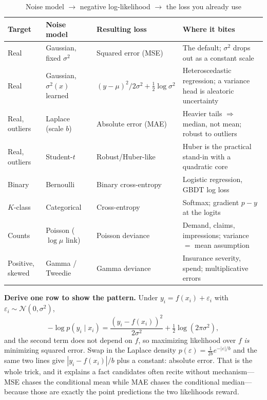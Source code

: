 \begin{table}[H]
\centering
\small
\caption{Noise model $\to$ negative log-likelihood $\to$ the loss you already use}
\label{cml:tab:mle_losses}
\begin{tabularx}{\textwidth}{lllX}
\toprule
\textbf{Target} & \textbf{Noise model} & \textbf{Resulting loss} & \textbf{Where it bites} \\
\midrule
Real & Gaussian, fixed $\sigma^2$ & Squared error (MSE) & The default; $\sigma^2$ drops out as a constant scale \\
Real & Gaussian, $\sigma^2(x)$ learned & $(y-\mu)^2/2\sigma^2 + \tfrac{1}{2}\log\sigma^2$ & Heteroscedastic regression; a variance head is aleatoric uncertainty \\
Real, outliers & Laplace (scale $b$) & Absolute error (MAE) & Heavier tails $\Rightarrow$ median, not mean; robust to outliers \\
Real, outliers & Student-$t$ & Robust/Huber-like & Huber is the practical stand-in with a quadratic core \\
Binary & Bernoulli & Binary cross-entropy & Logistic regression, GBDT log loss \\
$K$-class & Categorical & Cross-entropy & Softmax; gradient $p - y$ at the logits \\
Counts & Poisson ($\log\mu$ link) & Poisson deviance & Demand, claims, impressions; variance $=$ mean assumption \\
Positive, skewed & Gamma / Tweedie & Gamma deviance & Insurance severity, spend; multiplicative errors \\
\bottomrule
\end{tabularx}
\end{table}

\textbf{Derive one row to show the pattern.} Under $y_i = f(x_i) + \varepsilon_i$ with $\varepsilon_i \sim \mathcal{N}(0,\sigma^2)$,
\begin{equation}
-\log p(y_i \mid x_i) = \frac{(y_i - f(x_i))^2}{2\sigma^2} + \tfrac{1}{2}\log(2\pi\sigma^2),
\end{equation}
and the second term does not depend on $f$, so maximizing likelihood over $f$ \textit{is} minimizing squared error. Swap in the Laplace density $p(\varepsilon) = \tfrac{1}{2b}e^{-|\varepsilon|/b}$ and the same two lines give $|y_i - f(x_i)|/b$ plus a constant: absolute error. That is the whole trick, and it explains a fact candidates often recite without mechanism---MSE chases the conditional mean while MAE chases the conditional median---because those are exactly the point predictions the two likelihoods reward.

